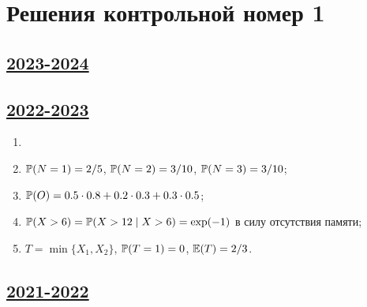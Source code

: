 
\thispagestyle{empty}
\section{Решения контрольной номер 1}


\subsection[2023-2024]{\hyperref[sec:kr_01_2023_2024]{2023-2024}}
\label{sec:sol_kr_01_2023_2024}


\subsection[2022-2023]{\hyperref[sec:kr_01_2022_2023]{2022-2023}}
\label{sec:sol_kr_01_2022_2023}

\begin{enumerate}
	\item 
	\item $\P(N=1) = 2/5$, $\P(N=2) = 3/10$, $\P(N=3) = 3/10$;
	\item $\P(O) = 0.5 \cdot 0.8 + 0.2 \cdot 0.3 + 0.3\cdot 0.5$; 
	\item $\P(X > 6) = \P(X > 12 \mid X>6) = \exp(-1)$ в силу отсутствия памяти;
	\item $T = \min \{X_1, X_2\}$, $\P(T=1) = 0$, $\E(T) = 2/3$.

\end{enumerate}


\subsection[2021-2022]{\hyperref[sec:kr_01_2021_2022]{2021-2022}}
\label{sec:sol_kr_01_2021_2022}

